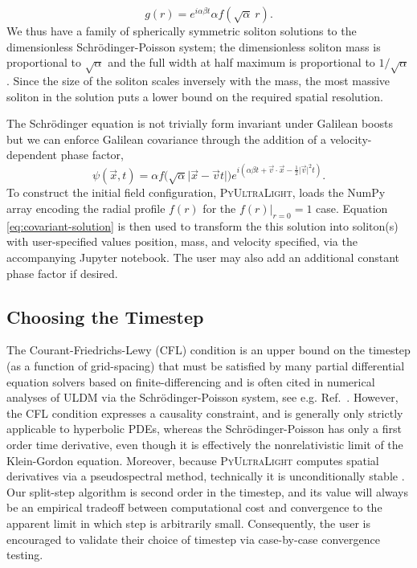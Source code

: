 \documentclass[a4paper,11pt]{article}
\newcommand{\PyUltraLight}{\textsc{PyUltraLight}\xspace}
\begin{document}
\begin{equation}
    g(r)=e^{i\alpha\beta t}\alpha f(\sqrt{\alpha}\ r).
\end{equation}
We thus have a family of spherically symmetric soliton solutions to the dimensionless Schr{\"o}\-dinger-Poisson system; the dimensionless soliton mass is proportional to $\sqrt{\alpha}$ and the full width at half maximum is proportional to $1/\sqrt{\alpha}$. Since the size of the soliton scales inversely with the mass, the most massive soliton in the solution  puts a lower bound on the required spatial resolution. 

The Schr{\"o}dinger equation is not trivially form invariant under Galilean boosts but we can enforce Galilean covariance through the addition of a velocity-dependent phase factor,
%
\begin{equation}\label{eq:covariant-solution}
    \psi(\vec{x},t)=\alpha f\big(\sqrt{\alpha}\vert\vec{x}-\vec{v}t\vert\big)e^{i\left(\alpha\beta t+\vec{v}\cdot\vec{x}-\frac{1}{2}\vert\vec{v}\vert^2t\right)}.
\end{equation}
%
To construct the initial field configuration,  \PyUltraLight, loads the NumPy array encoding the radial profile $f(r)$ for the $\left. f(r)\right|_{r=0}=1$ case. Equation \ref{eq:covariant-solution} is then used to transform the this solution into soliton(s) with user-specified values position, mass, and velocity specified, via the accompanying Jupyter notebook. The user may also add an additional constant phase factor if desired.

\subsection{Choosing the Timestep}

The Courant-Friedrichs-Lewy (CFL) condition is an upper bound on the timestep (as a function of grid-spacing) that must be satisfied by many partial differential equation solvers based on finite-differencing  \cite{Ajaib:2013oua} and is often cited in numerical analyses of ULDM via the Schr{\"o}dinger-Poisson system, see e.g. Ref.~\cite{Schwabe:2016rze}. However, the CFL condition expresses a causality constraint, and is generally only strictly applicable to hyperbolic PDEs, whereas the Schr{\"o}dinger-Poisson has only a first order time derivative, even though it is effectively the nonrelativistic limit of the Klein-Gordon equation. Moreover, because \PyUltraLight computes spatial derivatives via a pseudospectral method, technically it is unconditionally stable \cite{Taha:1984jz}. Our split-step algorithm is  second order in the timestep, and its value will always be an empirical tradeoff between computational cost and convergence to the apparent limit in which step is arbitrarily small. Consequently, the user is encouraged to validate their choice  of timestep via case-by-case  convergence testing. 
\end{document}
